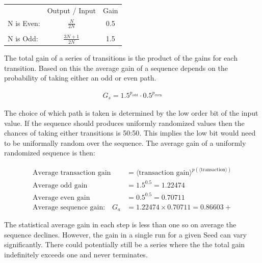 \documentclass[letterpaper]{article}
\begin{document}
\begin{multicols}{2}
\begin{center}
\begin{tabular}{l c c}
  & Output / Input & Gain \\
 N is Even: &  $\frac{N}{2N}$  & 0.5 \\  
&&\\
 N is Odd: & $\frac{3N + 1}{2N}$ & 1.5
\end{tabular}
\end{center}

The total gain of a series of transitions is the product of the gains for each transition. Based on this the average gain of a sequence depends on the probability of taking either an odd or even path.

\begin{align*}
    G_s = 1.5^{p_{\text{odd}}} \cdot 0.5^{p_{\text{even}}}
\end{align*}

The choice of which path is taken is determined by the low order bit of the input value. If the sequence should produces uniformly randomized values then the chances of taking either transitions is 50:50. This implies the low bit would need to be uniformally random over the sequence. The average gain of a uniformly randomized sequence is then:

\begin{align*}
    \text{Average transaction gain} &= \langle \text{transaction gain} \rangle^{p(\langle \text{transaction} \rangle)} \\
    \text{Average odd gain} &= 1.5^{0.5} = 1.22474 \\
    \text{Average even gain} &= 0.5^{0.5} = 0.70711 \\
    \text{Average sequence gain:} \quad G_a &= 1.22474 \times 0.70711 = 0.86603+
\end{align*}

The statistical average gain in each step is less than one so on average the sequence declines. However, the gain in a single run for a given Seed can vary significantly. There could potentially still be a series where the the total gain indefinitely exceeds one and never terminates.


\end{multicols}
\end{document}
